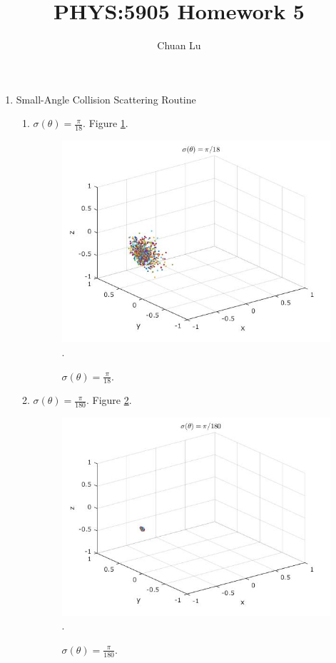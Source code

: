 \documentclass{article}
\begin{document}
\author{Chuan Lu}
\title{PHYS:5905 Homework 5}
\maketitle

\medskip

\begin{enumerate}
\item
Small-Angle Collision Scattering Routine

\begin{enumerate}
\item $\sigma(\theta) = \frac{\pi}{18}.$ Figure \ref{1-1}.

\begin{figure}[h]
\centering
\includegraphics[scale=0.4]{problem1/pi_18.jpg}.
\label{1-1}
\caption{$\sigma(\theta) = \frac{\pi}{18}.$}
\end{figure}

\item $\sigma(\theta) = \frac{\pi}{180}$. Figure \ref{1-2}.

\begin{figure}[h]
\centering
\includegraphics[scale=0.4]{problem1/pi_180.jpg}. 
\label{1-2}
\caption{$\sigma(\theta) = \frac{\pi}{180}.$}
\end{figure}


\end{enumerate}
\end{enumerate}
\end{document}
